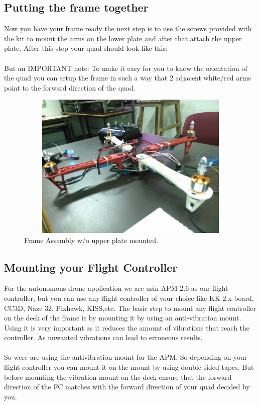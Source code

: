\documentclass[11pt,a4paper]{article}
\begin{document}
		\subsection{Putting the frame together}
		Now you have your frame ready the next step is to use the screws provided with the kit to mount the arms on the lower plate and after that attach the upper plate. After this step your quad should look like this:
		\paragraph{}But an IMPORTANT note: To make it easy for you to know the orientation of the quad you can setup the frame in such a way that 2 adjacent white/red arms point to the forward direction of the quad.
		\begin{figure}[h]
	 	
	 	\centering
		\includegraphics[width=12cm,height=7cm]{frame}
		\caption{Frame Assembly w/o upper plate mounted.}
		\end{figure}
		
		\subsection{Mounting your Flight Controller}
		For the autonomous drone application we are usin APM 2.6 as our flight controller, but you can use any flight controller of your choice like KK 2.x board, CC3D, Naze 32, Pixhawk, KISS,etc. The basic step to mount any flight controller on the deck of the frame is by mounting it by using an anti-vibration mount. Using it is very important as it reduces the amount of vibrations that reach the controller. As unwanted vibrations can lead to erroneous results.
		\paragraph{}So were are using the antivibration mount for the APM. So depending on your flight controller you can mount it on the mount by using double sided tapes. But before mounting the vibration mount on the deck ensure that the forward direction of the FC matches with the forward direction of your quad decided by you.
		
\end{document}
